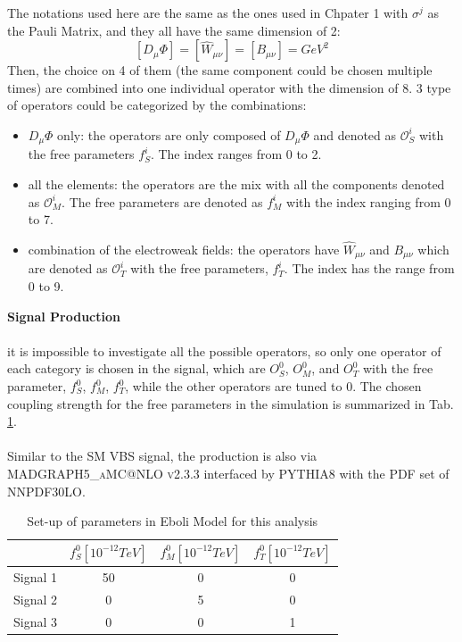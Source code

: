 The notations used here are the same as the ones used in Chpater 1 with $\sigma^j$ as the Pauli Matrix, and they all have the same dimension of 2:
\begin{equation}
\left[D_{\mu}\Phi\right]=\left[\hat{W}_{\mu\nu}\right]=\left[B_{\mu\nu}\right]= GeV^2
\end{equation}
Then, the choice on 4 of them (the same component could be chosen multiple times) are combined into one individual operator with the dimension of 8. 3 type of operators could be categorized by the combinations:
\begin{itemize}
    \item{$D_\mu\Phi$ only}: the operators are only composed of $D_\mu\Phi$ and denoted as $\mathcal{O}^i_S$ with the free parameters $f^i_{S}$. The index ranges from 0 to 2.  
    \item{all the elements}: the operators are the mix with all the components denoted as  $\mathcal{O}^i_M$. The free parameters are denoted as $f^i_{M}$ with the index ranging from 0 to 7.
    \item{combination of the electroweak fields}: the operators have $\hat{W}_{\mu\nu}$ and $B_{\mu\nu}$ which are denoted as $\mathcal{O}_{T}^i$ with the free parameters, $f_T^i$. The index has the range from 0 to 9. 
\end{itemize}
\noindent
{\bf Signal Production}
\\
\\it is impossible to investigate all the possible operators, so only one operator of each category is chosen in the signal, which are $O_{S}^0$, $O_{M}^0$, and $O_{T}^0$ with the free parameter, $f^0_{S}$, $f^0_{M}$,  $f_T^0$, while the other operators are tuned to 0.  The chosen coupling strength for the free parameters in the simulation is summarized in Tab. \ref{Tab:Eboli}.
\\
\\Similar to the SM VBS signal, the production is also via \textsc{MADGRAPH5\_aMC@NLO v2.3.3} interfaced by \textsc{PYTHIA8} with the PDF set of NNPDF30LO. 
\begin{table}[h]
	\caption{Set-up of parameters in Eboli Model for this analysis} \label{Tab:Eboli}
	\begin{center}
		\begin{tabular}{ | c | c | c | c | }
		\hline
			     &   $f^0_{S}\left[10^{-12}TeV\right]$  & $f^0_{M}\left[10^{-12}TeV\right]$ & $f^0_{T}\left[10^{-12}TeV\right]$ \\
	    \hline
	    Signal 1 &        50                            & 0                                & 0 \\
	    \hline
		Signal 2 &        0                             & 5                                & 0 \\
		\hline
		Signal 3 &        0                             & 0                                & 1 \\
		\hline
		\end{tabular}
	\end{center}
\end{table}
